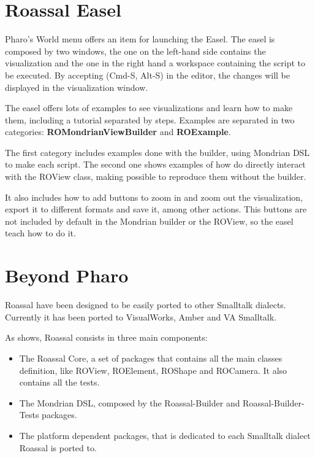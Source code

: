 \documentclass[a4paper,10pt,twoside]{book}
\begin{document}
\section{Roassal Easel}


Pharo's World menu offers an item for launching the Easel. The easel is composed by two windows, the one on the left-hand side contains the visualization and the one in the right hand a workspace containing the script to be executed. By accepting (Cmd-S, Alt-S) in the editor, the changes will be displayed in the visualization window.

The easel offers lots of examples to see visualizations and learn how to make them, including a tutorial separated by steps. Examples are separated in two categories: \textbf{ROMondrianViewBuilder} and \textbf{ROExample}.

The first category includes examples done with the builder, using Mondrian DSL to make each script. The second one shows examples of how do directly interact with the ROView class, making possible to reproduce them without the builder.

It also includes how to add buttons to zoom in and zoom out the visualization, export it to different formats and save it, among other actions. This buttons are not included by default in the Mondrian builder or the ROView, so the easel teach how to do it.
\section{Beyond Pharo}

Roassal have been designed to be easily ported to other Smalltalk dialects. Currently it has been ported to VisualWorks, Amber and VA Smalltalk.

As  shows, Roassal consists in three main components:

\begin{itemize}
\item  The Roassal Core, a set of packages that contains all the main classes definition, like ROView, ROElement, ROShape and ROCamera. It also contains all the tests.
\item The Mondrian DSL, composed by the Roassal-Builder and Roassal-Builder-Tests packages.
\item The platform dependent packages, that is dedicated to each Smalltalk dialect Roassal is ported to.
\end{itemize} 
\end{document}
